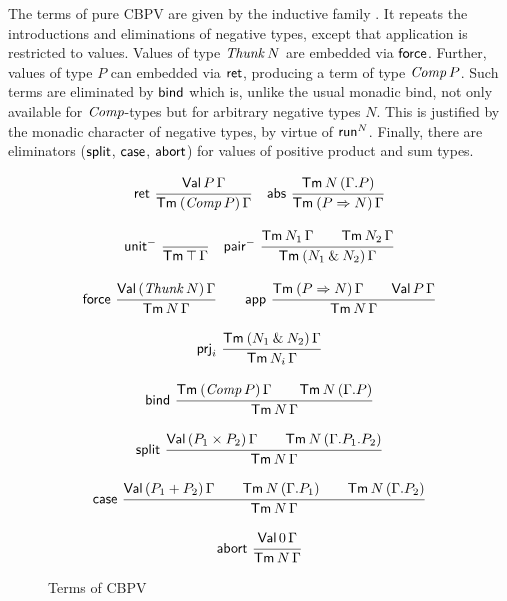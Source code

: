 \documentclass[sigplan,screen,fleqn]{acmart}
\begin{document}
The terms of pure CBPV are given by the inductive family .
It repeats the introductions and eliminations of negative types,
except that application is restricted to values.  Values of type
$\mathit{Thunk}\,N$ are embedded via $\mathsf{force}$.
Further, values of type $P$ can embedded
via $\mathsf{ret}$, producing a term of type $\mathit{Comp}\,P$.  Such terms are
eliminated by $\mathsf{bind}$ which is, unlike the usual monadic bind, not
only available for $\mathit{Comp}$-types but for arbitrary negative types
$N$.  This is justified by the monadic character of negative
types, by virtue of $\mathsf{run}^N$.  Finally, there are eliminators
($\mathsf{split}$, $\mathsf{case}$, $\mathsf{abort}$) for values of positive product and
sum types.
\begin{figure}[htbp]
\hrulefill
\begin{gather*}
  \nru{\tret}
      {\PValTm P \Gamma}
      {\TmP {\Comp P} \Gamma}
\quad
  \nru{\tabs}
      {\Tm N {(\cext \Gamma P)}}
      {\TmP {P \To N} \Gamma}
\\[2ex]
  \nru{\nunit}
      {}
      {\Tm \top \Gamma}
\quad
  \nru{\npair}
      {\Tm {N_1} \Gamma \qquad \Tm {N_2} \Gamma}
      {\TmP {N_1 \ntimes N_2} \Gamma}
\\[2ex]
  \nru{\tforce}
      {\PValTmP {\Thunk N} \Gamma}
      {\Tm N \Gamma}
\qquad
  \nru{\tapp}
      {\TmP {P \To N} \Gamma \qquad \PValTm P \Gamma}
      {\Tm N \Gamma}
\\[2ex]
  \nru{\tprj_i}
      {\TmP {N_1 \ntimes N_2} \Gamma}
      {\Tm {N_i} \Gamma}
\\[2ex]
  \nru{\tbind}
      {\TmP {\Comp P} \Gamma \qquad \Tm N {(\cext \Gamma P)}}
      {\Tm N \Gamma}
\\[2ex]
  \nru{\tsplit}
    {\PValTmP {P_1 \times P_2} \Gamma
      \qquad \Tm N {(\cext {\cext \Gamma P_1} P_2)}
    }{\Tm N \Gamma}
\\[2ex]
  \nru{\tcase}
    {\PValTmP {P_1 + P_2} \Gamma
      \qquad \Tm N {(\cext \Gamma P_1)}
      \qquad \Tm N {(\cext \Gamma P_2)}
    }{\Tm N \Gamma}
\\[2ex]
  \nru{\tabort}
    {\PValTm \tyzero \Gamma}
    {\Tm N \Gamma}
\end{gather*}
\hrulefill
  \caption{Terms of CBPV}
  \label{fig:tmcbpv}
\end{figure}
\end{document}
